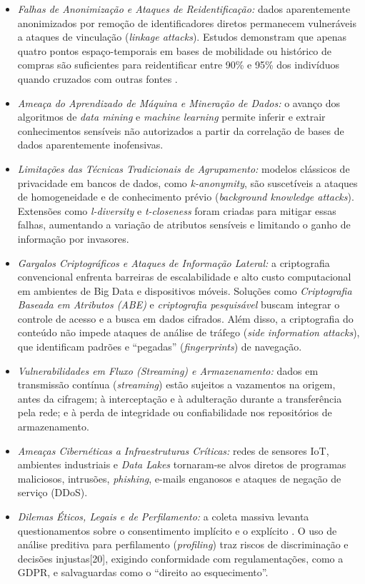 \begin{itemize}
    \item \textit{Falhas de Anonimização e Ataques de Reidentificação:} dados aparentemente anonimizados por remoção de identificadores diretos permanecem vulneráveis a ataques de vinculação (\emph{linkage attacks})\cite{7485855}. Estudos demonstram que apenas quatro pontos espaço-temporais em bases de mobilidade ou histórico de compras são suficientes para reidentificar entre 90\% e 95\% dos indivíduos quando cruzados com outras fontes \cite{7485855}.
    \item \textit{Ameaça do Aprendizado de Máquina e Mineração de Dados:} o avanço dos algoritmos de \emph{data mining} e \emph{machine learning} permite inferir e extrair conhecimentos sensíveis não autorizados a partir da correlação de bases de dados aparentemente inofensivas.
    \item \textit{Limitações das Técnicas Tradicionais de Agrupamento:} modelos clássicos de privacidade em bancos de dados, como \textit{\emph{k}-anonymity}, são suscetíveis a ataques de homogeneidade e de conhecimento prévio (\emph{background knowledge attacks})\cite{7485855}. Extensões como \textit{\emph{l}-diversity} e \textit{\emph{t}-closeness} foram criadas para mitigar essas falhas, aumentando a variação de atributos sensíveis e limitando o ganho de informação por invasores\cite{7485855}.
    \item \textit{Gargalos Criptográficos e Ataques de Informação Lateral:} a criptografia convencional enfrenta barreiras de escalabilidade e alto custo computacional em ambientes de Big Data e dispositivos móveis\cite{7485855}. Soluções como \textit{Criptografia Baseada em Atributos (ABE)} e \textit{criptografia pesquisável} buscam integrar o controle de acesso e a busca em dados cifrados\cite{7485855}. Além disso, a criptografia do conteúdo não impede ataques de análise de tráfego (\emph{side information attacks}), que identificam padrões e ``pegadas'' (\emph{fingerprints}) de navegação\cite{7485855}.
    \item \textit{Vulnerabilidades em Fluxo (\emph{Streaming}) e Armazenamento:} dados em transmissão contínua (\emph{streaming}) estão sujeitos a vazamentos na origem, antes da cifragem; à interceptação e à adulteração durante a transferência pela rede; e à perda de integridade ou confiabilidade nos repositórios de armazenamento\cite{Zhao2024}.
    \item \textit{Ameaças Cibernéticas a Infraestruturas Críticas:} redes de sensores IoT, ambientes industriais e \emph{Data Lakes} tornaram-se alvos diretos de programas maliciosos, intrusões, \emph{phishing}, e-mails enganosos e ataques de negação de serviço (DDoS)\cite{fi17090427}.
    \item \textit{Dilemas Éticos, Legais e de Perfilamento:} a coleta massiva levanta questionamentos sobre o consentimento implícito e o explícito \cite{ronald2025}. O uso de análise preditiva para perfilamento (\emph{profiling}) traz riscos de discriminação e decisões injustas[20], exigindo conformidade com regulamentações, como a GDPR, e salvaguardas como o ``direito ao esquecimento''\cite{7485855}.
\end{itemize}

